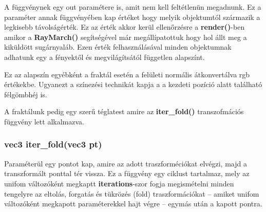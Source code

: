 A függvénynek egy out paramétere is, amit nem kell feltétlenün megadnunk. Ez a paraméter annak függvényében kap értéket hogy melyik objektumtól származik a legkisebb távolságérték. Ez az érték akkor kerül ellenőrzésre a \textbf{render()}-ben amikor a \textbf{RayMarch()} segítségével már megállípatottuk hogy hol állt meg a kiküldött sugárnyaláb. Ezen érték felhasználásával minden objektumnak adhatunk egy a fényektől és megvilágítsától független alapszínt.

Ez az alapszín egyébként a fraktál esetén a felületi normális átkonvertálva rgb értékekbe. Ugyanezt a színezési technikát kapja a a kezdeti pozíció alatt található félgömbhéj is. 

A fraktálunk pedig egy szerű téglatest amire az \textbf{iter\_fold()} transzofmációs függvény lett alkalmazva.

\subsubsection{vec3 iter\_fold(vec3 pt)}
Paraméterül egy pontot kap, amire az adott traszforméciókat elvégzi, majd a transzformált ponttal tér vissza. Ez a függvény egy ciklust tartalmaz, mely az unifom változóként megkaptt \textbf{iterations}-szor fogja megismételni minden tengelyre az eltolás, forgatás és tükrözés (fold) traszformációkat -- amiket unifom változóként megkapott paraméterekkel hajt végre -- egymás után a kapott pontra.

